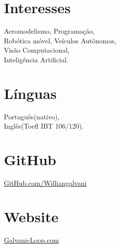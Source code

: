 \documentclass[letterpaper]{deedy-resume} %
\begin{document}
\begin{minipage}[t]{0.33\textwidth}
\sectionspace %


\section{Interesses}
Aeromodelismo, Programação,\\ Robótica móvel, Veículos Autônomos,\\Visão Computacional,\\ Inteligência Artificial.

\section{Línguas}
Português(nativo),\\ Inglês(Toefl IBT 106/120).

\section{GitHub}
\href{https://github.com/Williangalvani}{GitHub.com/Williangalvani}

\section{Website}
\href{https://GalvanicLoop.com}{GalvanicLoop.com}


\end{minipage} %
\hfill
%
%
\end{document}
